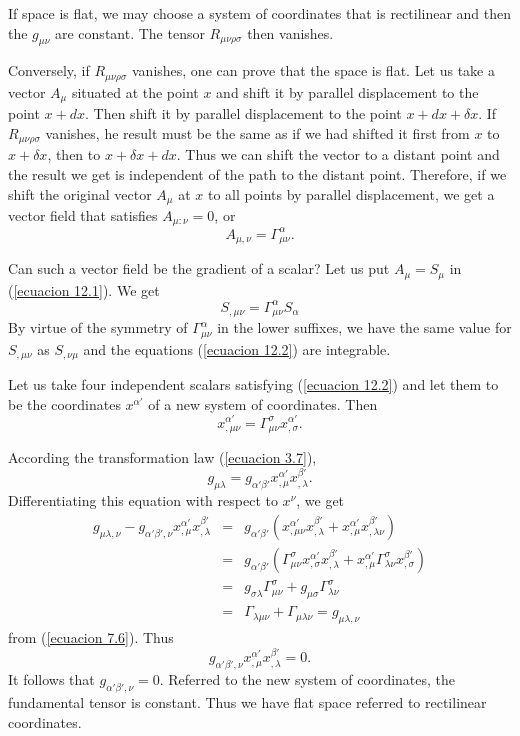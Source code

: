If space is flat, we may choose a system of coordinates that is rectilinear and then the $g_{\mu\nu}$ are constant. The 
tensor $R_{\mu\nu\rho\sigma}$ then vanishes.

Conversely, if $R_{\mu\nu\rho\sigma}$ vanishes, one can prove that the space is flat. Let us take a vector $A_{\mu}$ 
situated at the point $x$ and shift it by parallel displacement to the point $x+dx$. Then shift it by parallel 
displacement to the point $x+dx+\delta x$. If $R_{\mu\nu\rho\sigma}$ vanishes, he result must be the same as if we had 
shifted it first from $x$ to $x+\delta x$, then to $x+\delta x+ dx$. Thus we can shift the vector to a distant point and 
the result we get is independent of the path to the distant point. Therefore, if we shift the original vector $A_{\mu}$ 
at $x$ to all points by parallel displacement, we get a vector field that satisfies $A_{\mu:\nu}=0$, or
\begin{equation}
 \label{ecuacion 12.1}
 A_{\mu,\nu} = \Gamma^{\alpha}_{\mu\nu}.
\end{equation}

Can such a vector field be the gradient of a scalar? Let us put $A_{\mu} = 
S_{\mu}$ in (\ref{ecuacion 12.1}). We get 
\begin{equation}
 \label{ecuacion 12.2}
 S_{,\mu\nu} = \Gamma^{\alpha}_{\mu\nu} S_{\alpha}
\end{equation}
By virtue of the symmetry of $\Gamma^{\alpha}_{\mu\nu}$ in the lower suffixes, we have the same value for $S_{,\mu\nu}$ 
as $S_{,\nu\mu}$ and the equations (\ref{ecuacion 12.2}) are integrable.

Let us take four independent scalars satisfying (\ref{ecuacion 12.2}) and let them to be the coordinates $x^{\alpha'}$ 
of a new system of coordinates. Then
\[
 x^{\alpha'}_{,\mu\nu} = \Gamma^{\sigma}_{\mu\nu} x^{\alpha'}_{,\sigma}.
\]

According the transformation law (\ref{ecuacion 3.7}),
\[
g_{\mu\lambda} = g_{\alpha'\beta'}x^{\alpha'}_{,\mu}x^{\beta'}_{,\lambda}.
\]
Differentiating this equation with respect to $x^{\nu}$, we get
\[
\begin{array}{rcl}
 g_{\mu\lambda,\nu} - g_{\alpha'\beta',\nu}x^{\alpha'}_{,\mu}x^{\beta'}_{,\lambda} & = & 
    g_{\alpha'\beta'}\left(x^{\alpha'}_{,\mu\nu}x^{\beta'}_{,\lambda} 
    + x^{\alpha'}_{,\mu}x^{\beta'}_{,\lambda\nu} \right) \\
    & = & g_{\alpha'\beta'}\left(
    \Gamma^{\sigma}_{\mu\nu} x^{\alpha'}_{,\sigma} x^{\beta'}_{,\lambda} 
    + x^{\alpha'}_{,\mu} \Gamma^{\sigma}_{\lambda\nu} x^{\beta'}_{,\sigma}
    \right)\\
    & = & g_{\sigma\lambda} \Gamma^{\sigma}_{\mu\nu} + g_{\mu\sigma} \Gamma^{\sigma}_{\lambda\nu}\\
    & = & \Gamma_{\lambda\mu\nu} + \Gamma_{\mu\lambda\nu} = g_{\mu\lambda,\nu}
\end{array}
\]
from (\ref{ecuacion 7.6}). Thus
\[
g_{\alpha'\beta',\nu}x^{\alpha'}_{,\mu}x^{\beta'}_{,\lambda} = 0.
\]
It follows that $g_{\alpha'\beta',\nu}=0$. Referred to the new system of coordinates, the fundamental tensor is 
constant. Thus we have flat space referred to rectilinear coordinates.
